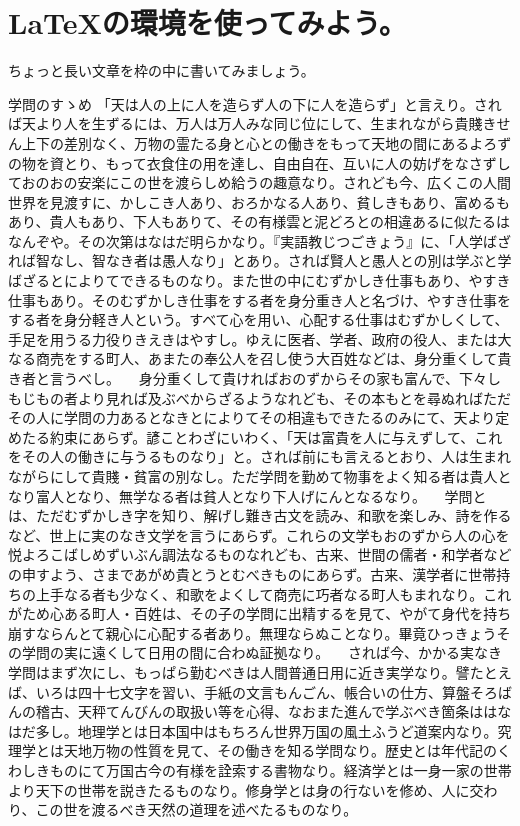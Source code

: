 \documentclass{ltjsarticle}
\begin{document}
\section{\LaTeX の環境を使ってみよう。}
ちょっと長い文章を枠の中に書いてみましょう。
\begin{itembox}[l]{学問のすゝめ}
「天は人の上に人を造らず人の下に人を造らず」と言えり。されば天より人を生ずるには、万人は万人みな同じ位にして、生まれながら貴賤きせん上下の差別なく、万物の霊たる身と心との働きをもって天地の間にあるよろずの物を資とり、もって衣食住の用を達し、自由自在、互いに人の妨げをなさずしておのおの安楽にこの世を渡らしめ給うの趣意なり。されども今、広くこの人間世界を見渡すに、かしこき人あり、おろかなる人あり、貧しきもあり、富めるもあり、貴人もあり、下人もありて、その有様雲と泥どろとの相違あるに似たるはなんぞや。その次第はなはだ明らかなり。『実語教じつごきょう』に、「人学ばざれば智なし、智なき者は愚人なり」とあり。されば賢人と愚人との別は学ぶと学ばざるとによりてできるものなり。また世の中にむずかしき仕事もあり、やすき仕事もあり。そのむずかしき仕事をする者を身分重き人と名づけ、やすき仕事をする者を身分軽き人という。すべて心を用い、心配する仕事はむずかしくして、手足を用うる力役りきえきはやすし。ゆえに医者、学者、政府の役人、または大なる商売をする町人、あまたの奉公人を召し使う大百姓などは、身分重くして貴き者と言うべし。
　身分重くして貴ければおのずからその家も富んで、下々しもじもの者より見れば及ぶべからざるようなれども、その本もとを尋ぬればただその人に学問の力あるとなきとによりてその相違もできたるのみにて、天より定めたる約束にあらず。諺ことわざにいわく、「天は富貴を人に与えずして、これをその人の働きに与うるものなり」と。されば前にも言えるとおり、人は生まれながらにして貴賤・貧富の別なし。ただ学問を勤めて物事をよく知る者は貴人となり富人となり、無学なる者は貧人となり下人げにんとなるなり。
　学問とは、ただむずかしき字を知り、解げし難き古文を読み、和歌を楽しみ、詩を作るなど、世上に実のなき文学を言うにあらず。これらの文学もおのずから人の心を悦よろこばしめずいぶん調法なるものなれども、古来、世間の儒者・和学者などの申すよう、さまであがめ貴とうとむべきものにあらず。古来、漢学者に世帯持ちの上手なる者も少なく、和歌をよくして商売に巧者なる町人もまれなり。これがため心ある町人・百姓は、その子の学問に出精するを見て、やがて身代を持ち崩すならんとて親心に心配する者あり。無理ならぬことなり。畢竟ひっきょうその学問の実に遠くして日用の間に合わぬ証拠なり。
　されば今、かかる実なき学問はまず次にし、もっぱら勤むべきは人間普通日用に近き実学なり。譬たとえば、いろは四十七文字を習い、手紙の文言もんごん、帳合いの仕方、算盤そろばんの稽古、天秤てんびんの取扱い等を心得、なおまた進んで学ぶべき箇条ははなはだ多し。地理学とは日本国中はもちろん世界万国の風土ふうど道案内なり。究理学とは天地万物の性質を見て、その働きを知る学問なり。歴史とは年代記のくわしきものにて万国古今の有様を詮索する書物なり。経済学とは一身一家の世帯より天下の世帯を説きたるものなり。修身学とは身の行ないを修め、人に交わり、この世を渡るべき天然の道理を述べたるものなり。

\end{itembox}
\end{document}
